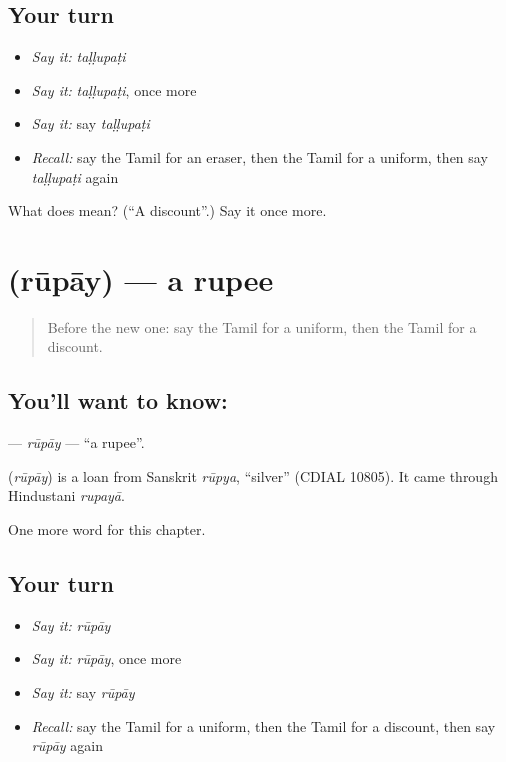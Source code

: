 \subsection*{Your turn}
\begin{itemize}
\raggedright
  \item \emph{Say it:} \emph{taḷḷupaṭi}
  \item \emph{Say it:} \emph{taḷḷupaṭi}, once more
  \item \emph{Say it:} say \emph{taḷḷupaṭi}
  \item \emph{Recall:} say the Tamil for an eraser, then the Tamil for a uniform, then say \emph{taḷḷupaṭi} again
\end{itemize}

\begin{tcolorbox}[breakable,colback=teal!4,colframe=teal!35!black,title={Before you move on}]
What does  mean? (\textquotedblleft{}A discount\textquotedblright{}.) Say it once more.
\end{tcolorbox}
\section[\texorpdfstring{\ta{ரூபாய்} (rūpāy)}{ரூபாய் (rūpāy)}]{ (rūpāy) — a rupee}

\label{lesson:TA-C222-rupay}



\begin{quote}
Before the new one: say the Tamil for a uniform, then the Tamil for a discount.
\end{quote}

\subsection*{You'll want to know: }
\textbf{} — \emph{rūpāy} — \textquotedblleft{}a rupee\textquotedblright{}.

\begin{cousinweb}
\textbf{} (\emph{rūpāy}) is a loan from Sanskrit \emph{rūpya}, \textquotedblleft{}silver\textquotedblright{} (CDIAL 10805). It came through Hindustani \emph{rupayā}.
\end{cousinweb}

\begin{grammarlens}[title={What you've built}]
One more word for this chapter.
\end{grammarlens}

\subsection*{Your turn}
\begin{itemize}
\raggedright
  \item \emph{Say it:} \emph{rūpāy}
  \item \emph{Say it:} \emph{rūpāy}, once more
  \item \emph{Say it:} say \emph{rūpāy}
  \item \emph{Recall:} say the Tamil for a uniform, then the Tamil for a discount, then say \emph{rūpāy} again
\end{itemize}

